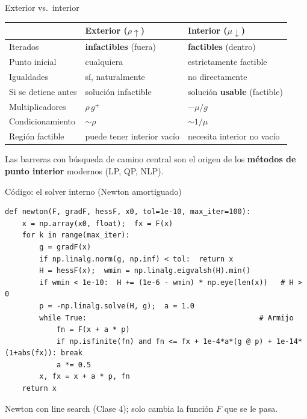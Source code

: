 \documentclass[aspectratio=169]{beamer}
\begin{document}
\begin{frame}{Exterior vs.\ interior}
  \centering\small
  \begin{tabular}{p{3.0cm}p{4.3cm}p{4.3cm}}
    \toprule
    & \textbf{Exterior ($\rho\uparrow$)} & \textbf{Interior ($\mu\downarrow$)}\\
    \midrule
    Iterados & \textbf{infactibles} (fuera) & \textbf{factibles} (dentro)\\
    Punto inicial & cualquiera & estrictamente factible\\
    Igualdades & sí, naturalmente & no directamente\\
    Si se detiene antes & solución infactible & solución \textbf{usable} (factible)\\
    Multiplicadores & $\rho\,g^+$ & $-\mu/g$\\
    Condicionamiento & $\sim\rho$ & $\sim1/\mu$\\
    Región factible & puede tener interior vacío & necesita interior no vacío\\
    \bottomrule
  \end{tabular}
  \vspace{0.3cm}

  \normalsize
  Las barreras con búsqueda de camino central son el origen de los \textbf{métodos de punto interior} modernos (LP, QP, NLP).
\end{frame}

\begin{frame}[fragile]{Código: el solver interno (Newton amortiguado)}
\begin{lstlisting}[basicstyle=\ttfamily\fontsize{7}{8.2}\selectfont,breaklines=false]
def newton(F, gradF, hessF, x0, tol=1e-10, max_iter=100):
    x = np.array(x0, float);  fx = F(x)
    for k in range(max_iter):
        g = gradF(x)
        if np.linalg.norm(g, np.inf) < tol:  return x
        H = hessF(x);  wmin = np.linalg.eigvalsh(H).min()
        if wmin < 1e-10:  H += (1e-6 - wmin) * np.eye(len(x))   # H > 0
        p = -np.linalg.solve(H, g);  a = 1.0
        while True:                                        # Armijo
            fn = F(x + a * p)
            if np.isfinite(fn) and fn <= fx + 1e-4*a*(g @ p) + 1e-14*(1+abs(fx)): break
            a *= 0.5
        x, fx = x + a * p, fn
    return x
\end{lstlisting}
  \footnotesize Newton con line search (Clase 4); solo cambia la función $F$ que se le pasa.
\end{frame}
\end{document}
